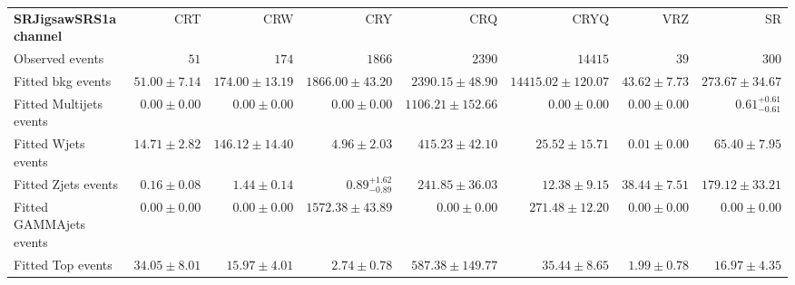 

\begin{table}
\begin{center}
\setlength{\tabcolsep}{0.0pc}
{\tiny
\begin{tabular*}{\textwidth}{@{\extracolsep{\fill}}lrrrrrrr}
\noalign{\smallskip}\hline\noalign{\smallskip}
{\bf SRJigsawSRS1a channel}           & CRT            & CRW            & CRY            & CRQ            & CRYQ            & VRZ            & SR              \\[-0.05cm]
\noalign{\smallskip}\hline\noalign{\smallskip}
Observed events          & $51$              & $174$              & $1866$              & $2390$              & $14415$              & $39$              & $300$                    \\
\noalign{\smallskip}\hline\noalign{\smallskip}
Fitted bkg events         & $51.00 \pm 7.14$          & $174.00 \pm 13.19$          & $1866.00 \pm 43.20$          & $2390.15 \pm 48.90$          & $14415.02 \pm 120.07$          & $43.62 \pm 7.73$          & $273.67 \pm 34.67$              \\
\noalign{\smallskip}\hline\noalign{\smallskip}
        Fitted Multijets events         & $0.00 \pm 0.00$          & $0.00 \pm 0.00$          & $0.00 \pm 0.00$          & $1106.21 \pm 152.66$          & $0.00 \pm 0.00$          & $0.00 \pm 0.00$          & $0.61_{-0.61}^{+0.61}$              \\
        Fitted Wjets events         & $14.71 \pm 2.82$          & $146.12 \pm 14.40$          & $4.96 \pm 2.03$          & $415.23 \pm 42.10$          & $25.52 \pm 15.71$          & $0.01 \pm 0.00$          & $65.40 \pm 7.95$              \\
        Fitted Zjets events         & $0.16 \pm 0.08$          & $1.44 \pm 0.14$          & $0.89_{-0.89}^{+1.62}$          & $241.85 \pm 36.03$          & $12.38 \pm 9.15$          & $38.44 \pm 7.51$          & $179.12 \pm 33.21$              \\
        Fitted GAMMAjets events         & $0.00 \pm 0.00$          & $0.00 \pm 0.00$          & $1572.38 \pm 43.89$          & $0.00 \pm 0.00$          & $271.48 \pm 12.20$          & $0.00 \pm 0.00$          & $0.00 \pm 0.00$              \\
        Fitted Top events         & $34.05 \pm 8.01$          & $15.97 \pm 4.01$          & $2.74 \pm 0.78$          & $587.38 \pm 149.77$          & $35.44 \pm 8.65$          & $1.99 \pm 0.78$          & $16.97 \pm 4.35$              \\

\end{tabular*}}
\end{center}
\end{table}

